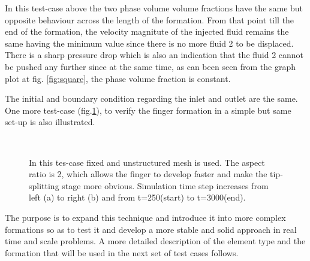 \documentclass[preprint,authoryear,12pt]{elsarticle}
\begin{document}
In this test-case above the two phase volume volume fractions have the same but opposite behaviour across the length of the formation. From that point till the end of the formation, the velocity magnitute of the injected fluid remains the same having the minimum value since there is no more fluid 2 to be displaced. There is a sharp pressure drop which is also an indication that the fluid 2 cannot be pushed any further since at the same time, as can been seen from the graph plot at fig. \ref{fig:square}, the phase volume fraction is constant.  

The initial and boundary condition regarding the inlet and outlet are the same. One more test-case (fig.\ref{fig:testcase}), to verify the finger formation in a simple but same set-up is also illustrated.

\begin{figure}[h]
\begin{center}
%
\\
\end{center}
\caption{In this tes-case fixed and unstructured mesh is used. The aspect ratio is 2, which allows the finger to develop faster and make the tip-splitting stage more obvious. Simulation time step increases from left (a) to right (b) and from t=250(start) to t=3000(end).}
\label{fig:testcase}
\end{figure}

 The purpose is to expand this technique and introduce it into more complex formations so as to test it and develop a more stable and solid approach in real time and scale problems. A more detailed description of the element type and the formation that will be used in the next set of test cases follows.
\end{document}
